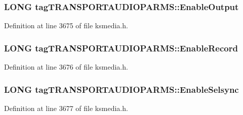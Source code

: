 \subsubsection[{\texorpdfstring{Enable\+Output}{EnableOutput}}]{\setlength{\rightskip}{0pt plus 5cm}L\+O\+NG tag\+T\+R\+A\+N\+S\+P\+O\+R\+T\+A\+U\+D\+I\+O\+P\+A\+R\+M\+S\+::\+Enable\+Output}\hypertarget{structtag_t_r_a_n_s_p_o_r_t_a_u_d_i_o_p_a_r_m_s_ae82f3a735ff94e142f4fb7e0c1fad39d}{}\label{structtag_t_r_a_n_s_p_o_r_t_a_u_d_i_o_p_a_r_m_s_ae82f3a735ff94e142f4fb7e0c1fad39d}


Definition at line 3675 of file ksmedia.\+h.

\subsubsection[{\texorpdfstring{Enable\+Record}{EnableRecord}}]{\setlength{\rightskip}{0pt plus 5cm}L\+O\+NG tag\+T\+R\+A\+N\+S\+P\+O\+R\+T\+A\+U\+D\+I\+O\+P\+A\+R\+M\+S\+::\+Enable\+Record}\hypertarget{structtag_t_r_a_n_s_p_o_r_t_a_u_d_i_o_p_a_r_m_s_addbea4e7ecd2e7a3977089427ff2ba24}{}\label{structtag_t_r_a_n_s_p_o_r_t_a_u_d_i_o_p_a_r_m_s_addbea4e7ecd2e7a3977089427ff2ba24}


Definition at line 3676 of file ksmedia.\+h.

\subsubsection[{\texorpdfstring{Enable\+Selsync}{EnableSelsync}}]{\setlength{\rightskip}{0pt plus 5cm}L\+O\+NG tag\+T\+R\+A\+N\+S\+P\+O\+R\+T\+A\+U\+D\+I\+O\+P\+A\+R\+M\+S\+::\+Enable\+Selsync}\hypertarget{structtag_t_r_a_n_s_p_o_r_t_a_u_d_i_o_p_a_r_m_s_a06c656cd062b74af0aaabbab616b1962}{}\label{structtag_t_r_a_n_s_p_o_r_t_a_u_d_i_o_p_a_r_m_s_a06c656cd062b74af0aaabbab616b1962}


Definition at line 3677 of file ksmedia.\+h.

